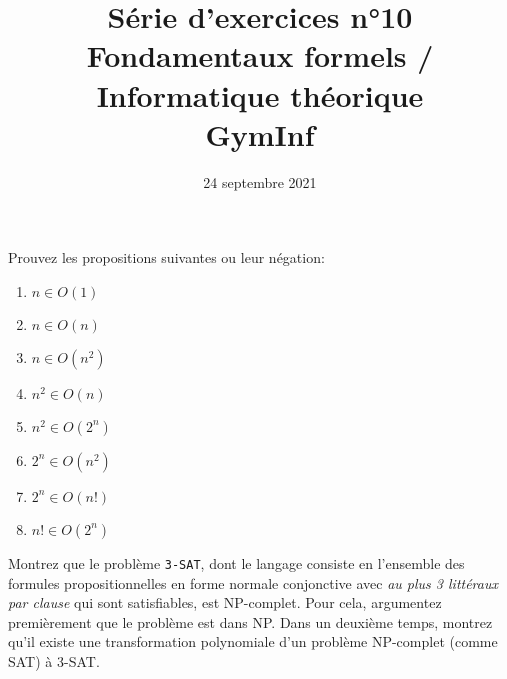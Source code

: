 \documentclass[12pt,french,a4paper]{article}
\begin{document}
\title{\vspace{-2cm}Série d'exercices n°10\\\large{Fondamentaux formels / Informatique théorique\\GymInf}}
\date{\vspace{-1cm}24 septembre 2021}

\maketitle

\begin{question}
Prouvez les propositions suivantes ou leur négation:
\begin{enumerate}
\item $n \in O(1)$
\item $n \in O(n)$
\item $n \in O(n^2)$
\item $n^2 \in O(n)$
\item $n^2 \in O(2^n)$
\item $2^n \in O(n^2)$
\item $2^n \in O(n!)$
\item $n! \in O(2^n)$
\end{enumerate}
\end{question}

\vspace{4cm}

\begin{question}
Montrez que le problème \texttt{3-SAT}, dont le langage consiste en l'ensemble des formules propositionnelles en forme normale conjonctive avec \textit{au plus 3 littéraux par clause} qui sont satisfiables, est NP-complet. Pour cela, argumentez premièrement que le problème est dans NP.
Dans un deuxième temps, montrez qu'il existe une transformation polynomiale d'un problème NP-complet (comme SAT) à 3-SAT.
\end{question}
\end{document}

